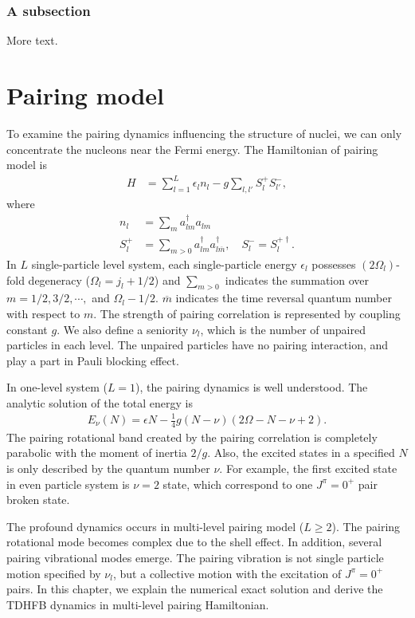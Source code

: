 \documentclass[11pt]{book} %
\begin{document}
\subsection{A subsection}

More text.

\chapter{Pairing model}

To examine the pairing dynamics influencing the structure of nuclei, we can only concentrate the nucleons near the Fermi energy. The Hamiltonian of pairing model is
\begin{align}
	H &= \sum_{l=1}^L \epsilon_l n_l - g \sum_{l,l'} S_l^+ S_{l'}^- ,
\end{align}
where
\begin{align}
	n_l &= \sum_m a^{\dag}_{lm}a_{lm} \\
        S_l^{+} &= \sum_{m>0}a_{lm}^{\dag}a_{l\overline{m}}^{\dag} ,
\quad   S_l^{-} = S_l^{+\dag} .
\label{S_+}
\end{align}
In $L$ single-particle level system, each single-particle energy $\epsilon_l$ possesses $(2\Omega_l)$-fold
degeneracy ($\Omega_l=j_l+1/2$)
and $\sum_{m>0}$ indicates the summation over $m=1/2,3/2,\cdots,$ and $\Omega_l-1/2$. $\overline{m}$ indicates the time reversal quantum number with respect to $m$. The strength of pairing correlation is represented by coupling constant $g$. We also define a seniority $\nu_l$, which is the number of unpaired particles in each level. The unpaired particles have no pairing interaction, and play a part in Pauli blocking effect.\par
In one-level system ($L=1$), the pairing dynamics is well understood. The analytic solution of the total energy is
\begin{align}
	E_{\nu}(N) = \epsilon N - \frac{1}{4}g(N-\nu)(2\Omega-N-\nu+2) .
	\label{onelevel}
\end{align}
The pairing rotational band created by the pairing correlation is completely parabolic with the moment of inertia $2/g$. Also, the excited states in a specified $N$ is only described by the quantum number $\nu$. For example, the first excited state in even particle system is $\nu=2$ state, which correspond to one $J^{\pi}=0^+$ pair broken state.\par
The profound dynamics occurs in multi-level pairing model ($L\ge 2$). The pairing rotational mode becomes complex due to the shell effect. In addition, several pairing vibrational modes emerge. The pairing vibration is not single particle motion specified by $\nu_l$, but a collective motion with the excitation of $J^{\pi}=0^+$ pairs. In this chapter, we explain the numerical exact solution and derive the TDHFB dynamics in multi-level pairing Hamiltonian.
\end{document}
